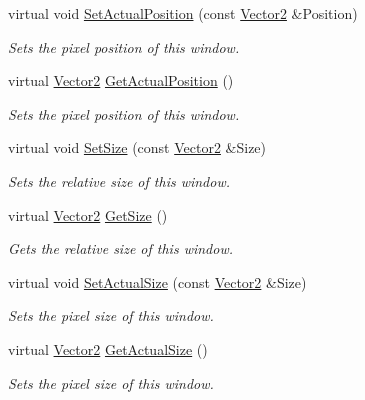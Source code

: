 \begin{DoxyCompactItemize}
virtual void \hyperlink{classphys_1_1UI_1_1Window_a45a3d0454803ce26a053f645b965d16b}{SetActualPosition} (const \hyperlink{classphys_1_1Vector2}{Vector2} \&Position)
\begin{DoxyCompactList}\small\item\em Sets the pixel position of this window. \item\end{DoxyCompactList}\item 
virtual \hyperlink{classphys_1_1Vector2}{Vector2} \hyperlink{classphys_1_1UI_1_1Window_a811fb495bc698752e03778b18f2b1a30}{GetActualPosition} ()
\begin{DoxyCompactList}\small\item\em Sets the pixel position of this window. \item\end{DoxyCompactList}\item 
virtual void \hyperlink{classphys_1_1UI_1_1Window_a88ed4d21758cee9afeadc4069c3e0b04}{SetSize} (const \hyperlink{classphys_1_1Vector2}{Vector2} \&Size)
\begin{DoxyCompactList}\small\item\em Sets the relative size of this window. \item\end{DoxyCompactList}\item 
virtual \hyperlink{classphys_1_1Vector2}{Vector2} \hyperlink{classphys_1_1UI_1_1Window_a9946100eb6e6e985921bbea9e87cede3}{GetSize} ()
\begin{DoxyCompactList}\small\item\em Gets the relative size of this window. \item\end{DoxyCompactList}\item 
virtual void \hyperlink{classphys_1_1UI_1_1Window_a002150cd8db87283bead5f10b2310152}{SetActualSize} (const \hyperlink{classphys_1_1Vector2}{Vector2} \&Size)
\begin{DoxyCompactList}\small\item\em Sets the pixel size of this window. \item\end{DoxyCompactList}\item 
virtual \hyperlink{classphys_1_1Vector2}{Vector2} \hyperlink{classphys_1_1UI_1_1Window_a22f5ca800e44c5e2cfeed59c243b03ed}{GetActualSize} ()
\begin{DoxyCompactList}\small\item\em Sets the pixel size of this window. \item\end{DoxyCompactList}\item 

\end{DoxyCompactItemize}
